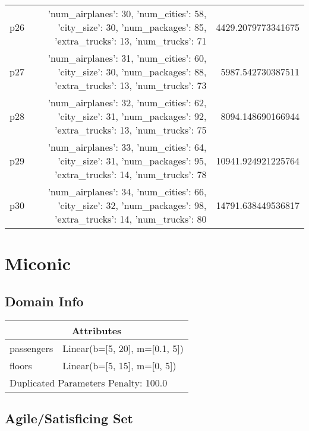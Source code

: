 \documentclass{article}
\begin{document}
\begin{center}
\begin{tabular}{r|r|r}
  p26&{'num\_airplanes': 30, 'num\_cities': 58, 'city\_size': 30, 'num\_packages': 85, 'extra\_trucks': 13, 'num\_trucks': 71}&4429.2079773341675\\
  p27&{'num\_airplanes': 31, 'num\_cities': 60, 'city\_size': 30, 'num\_packages': 88, 'extra\_trucks': 13, 'num\_trucks': 73}&5987.542730387511\\
  p28&{'num\_airplanes': 32, 'num\_cities': 62, 'city\_size': 31, 'num\_packages': 92, 'extra\_trucks': 13, 'num\_trucks': 75}&8094.148690166944\\
  p29&{'num\_airplanes': 33, 'num\_cities': 64, 'city\_size': 31, 'num\_packages': 95, 'extra\_trucks': 14, 'num\_trucks': 78}&10941.924921225764\\
  p30&{'num\_airplanes': 34, 'num\_cities': 66, 'city\_size': 32, 'num\_packages': 98, 'extra\_trucks': 14, 'num\_trucks': 80}&14791.638449536817
                            \end{tabular}
                            \end{center}
                    
                            \newpage \section{Miconic}
                    \subsection*{Domain Info}

                    \begin{center}
                    \begin{tabular}{p{}p{}}
                    \multicolumn{2}{c}{\bf \large Attributes}\\\midrule
                    passengers & Linear(b=[5, 20], m=[0.1, 5])\\
floors & Linear(b=[5, 15], m=[0, 5])
                    
                     \\\midrule
                    \multicolumn{2}{l}{Duplicated Parameters Penalty: 100.0}
                    \end{tabular}
                    \end{center}
                
                         \subsection*{Agile/Satisficing Set}
\end{document}
